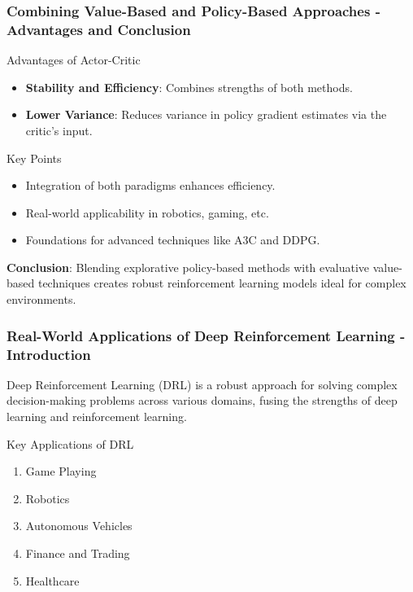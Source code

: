 \documentclass[aspectratio=169]{beamer}
\begin{document}
\begin{frame}[fragile]
    \frametitle{Combining Value-Based and Policy-Based Approaches - Advantages and Conclusion}
    \begin{block}{Advantages of Actor-Critic}
        \begin{itemize}
            \item \textbf{Stability and Efficiency}: Combines strengths of both methods.
            \item \textbf{Lower Variance}: Reduces variance in policy gradient estimates via the critic's input.
        \end{itemize}
    \end{block}

    \begin{block}{Key Points}
        \begin{itemize}
            \item Integration of both paradigms enhances efficiency.
            \item Real-world applicability in robotics, gaming, etc.
            \item Foundations for advanced techniques like A3C and DDPG.
        \end{itemize}
    \end{block}

    \textbf{Conclusion}: Blending explorative policy-based methods with evaluative value-based techniques creates robust reinforcement learning models ideal for complex environments.
\end{frame}

\begin{frame}[fragile]
    \frametitle{Real-World Applications of Deep Reinforcement Learning - Introduction}
    Deep Reinforcement Learning (DRL) is a robust approach for solving complex decision-making problems across various domains, fusing the strengths of deep learning and reinforcement learning.
    
    \begin{block}{Key Applications of DRL}
        \begin{enumerate}
            \item Game Playing
            \item Robotics
            \item Autonomous Vehicles
            \item Finance and Trading
            \item Healthcare
        \end{enumerate}
    \end{block}
\end{frame}
\end{document}
